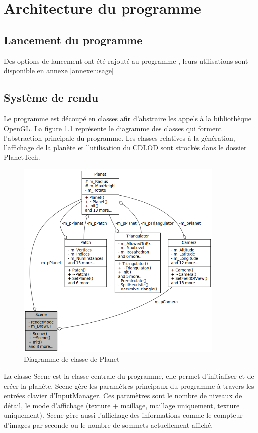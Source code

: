   	
  \chapter{Architecture du programme}
  
  \section{Lancement du programme}
  Des options de lancement ont été rajouté au programme , leurs utilisations sont disponible en annexe \ref{annexe:usage}
  

  \section{Système de rendu}
  Le programme est découpé en classes afin d'abstraire les appels à la bibliothèque OpenGL. La figure \ref{fig:uml_scene} représente le diagramme des classes qui forment l'abstraction principale du programme.
  Les classes relatives à la génération, l'affichage de la planète et l'utilisation du CDLOD sont strockés dans le dossier
  PlanetTech.
  
  \begin{figure}
  \centering
  \includegraphics[width=10cm]{img/uml_scene.png}
  \caption{Diagramme de classe de Planet}
  \label{fig:uml_scene}
  \end{figure}

  La classe Scene est la classe centrale du programme, elle permet
  d'initialiser et de créer la planète. Scene gère les paramètres
  principaux du programme à travers les entrées clavier d'InputManager.
  Ces paramètres sont le nombre de niveaux de détail, le mode d'affichage
  (texture + maillage, maillage uniquement, texture uniquement). Scene
  gère aussi l'affichage des informations comme le compteur d'images par
  seconde ou le nombre de sommets actuellement affiché.
  
